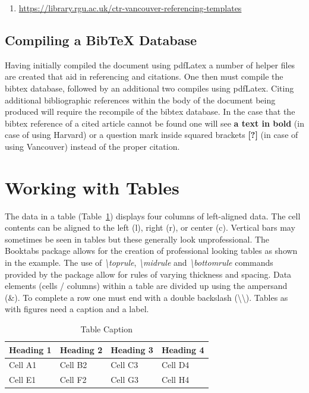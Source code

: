 \begin{enumerate}
    \item \url{https://library.rgu.ac.uk/ctr-vancouver-referencing-templates}
\end{enumerate}

\subsection{Compiling a BibTeX Database}

Having initially compiled the document using pdfLatex a number of helper files are created that aid in referencing and citations. One then must compile the bibtex database, followed by an additional two compiles using pdfLatex. Citing additional bibliographic references within the body of the document being produced will require the recompile of the bibtex database. In the case that the bibtex reference of a cited article cannot be found one will see \textbf{a text in bold} (in case of using Harvard) or a question mark inside squared brackets \textbf{[?]} (in case of using Vancouver) instead of the proper citation.

\section{Working with Tables}

The data in a table (Table~\ref{tab:using:TableExample}) displays four columns of left-aligned data. The cell contents can be aligned to the left (l), right (r), or center (c). Vertical bars may sometimes be seen in tables but these generally look unprofessional. The Booktabs package \cite{web:Fear2005BookTabs} allows for the creation of professional looking tables as shown in the example.  The use of \emph{\textbackslash toprule}, \emph{\textbackslash midrule} and \emph{\textbackslash bottomrule} commands provided by the package allow for rules of varying thickness and spacing. Data elements (cells / columns) within a table are divided up using the ampersand (\&). To complete a row one must end with a double backslash (\textbackslash\textbackslash). Tables as with figures need a caption and a label.


\begin{table}[H]
\centering
\small
\begin{tabular}{llll}
\toprule \textbf{Heading 1}& \textbf{Heading 2}&\textbf{Heading 3}&\textbf{Heading 4}\\
\midrule
Cell A1 & Cell B2 & Cell C3 & Cell D4\\
Cell E1 & Cell F2 & Cell G3 & Cell H4\\
\bottomrule
\end{tabular}
\caption{Table Caption}\label{tab:using:TableExample}
\end{table}



